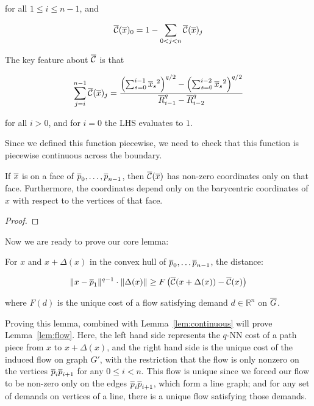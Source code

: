 {for all $1 \leq i \leq n-1$, and 

\[ \overline{\mathcal{C}}(\overline{x})_0 = 1 - \sum_{0 < j < n} \overline{\mathcal{C}}(\overline{x})_j
\]

The key feature about $\overline{\mathcal{C}}$ is that

\[\sum_{j=i}^{n-1} \overline{\mathcal{C}}(\overline{x})_j= \frac{
\left(\sum_{s=0}^{i-1} {\overline{x}_s}^2\right)^{q/2} -\left(\sum_{s=0}^{i-2}
{\overline{x}_s}^2\right)^{q/2}
}
{
\overline{R}_{i-1}^q - \overline{R}_{i-2}^q
}\]

for all $i > 0$, and for $i = 0$ the LHS evaluates to $1$. 

Since we defined this function piecewise, we need to check that this
function is piecewise continuous across the boundary.

\begin{lemma}\label{lem:continuous}
If $\overline{x}$ is on a face of $\overline{p}_0, \ldots, \overline{p}_{n-1}$, then
$\overline{\mathcal{C}}(\overline{x})$ has non-zero coordinates only on that face. Furthermore, the
coordinates depend only on the barycentric coordinates of $x$ with respect
to the vertices of that face.
\end{lemma}

\begin{proof}
\end{proof}

Now we are ready to prove our core lemma:
\begin{lemma} For $x$ and $x+\Delta(x)$ in the convex hull of $\overline{p}_0,
\ldots \overline{p}_{n-1}$, the distance:

\[ \|x-\overline{p}_1\|^{q-1} \cdot \|\Delta(x)\| \geq
F\left(\overline{\mathcal{C}}(x+\Delta(x))-\overline{\mathcal{C}}(x)\right)\]

where $F(d)$ is the unique cost of a flow satisfying demand $d \in
\mathbb{R}^n$ on $\overline{G}$.

\end{lemma}
Proving this lemma, combined with Lemma~\ref{lem:continuous} will prove
Lemma~\ref{lem:flow}.
Here, the left hand side represents the $q$-NN cost of a path piece from
$x$ to $x+\Delta(x)$, and the right hand side is the unique cost of the
induced flow on graph $G'$, with the restriction that the flow is only
nonzero on the vertices $\overline{p}_i\overline{p}_{i+1}$ for any $0 \leq i < n$. This flow
is unique since we forced our flow to be non-zero only on the edges
$\overline{p}_i\overline{p}_{i+1}$, which form a line graph; and for any set of demands on
vertices of a line, there is a unique flow satisfying those demands.

}

